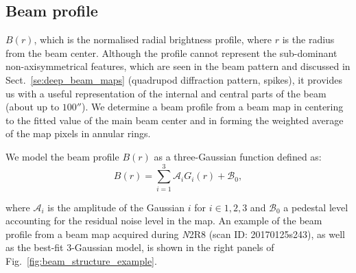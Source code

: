 

\subsection{Beam profile}
\label{se:fullbeam_prof}

 $B(r)$, which is the normalised radial brightness profile,
where $r$ is the radius from the beam center.
Although the profile cannot represent the sub-dominant non-axisymmetrical
features, which are seen in the beam pattern and discussed in
Sect.~\ref{se:deep_beam_maps} (quadrupod diffraction pattern, spikes), it provides us with a useful
representation of the internal and central parts of the beam (about up to
$100''$). We determine a beam profile from a beam map in centering to
the fitted value of the main beam center and in forming the
weighted average of the map pixels in annular rings.

We model the beam profile $B(r)$ as a three-Gaussian function defined as:
\begin{equation}
  B(r) = \sum_{i=1}^{3} \mathcal{A}_i G_i(r) + \mathcal{B}_0,
  \label{eq:3gauss}
\end{equation}

where $\mathcal{A}_i$ is the amplitude of the Gaussian $i$ for $i \in {1, 2, 3}$ and
$\mathcal{B}_0$ a pedestal level accounting for the residual noise
level in the map.
An example of the beam profile from a beam map acquired during {\emph N2R8} (scan ID:
20170125s243), as well as the best-fit 3-Gaussian model, is shown in
the right panels of Fig.~\ref{fig:beam_structure_example}.


